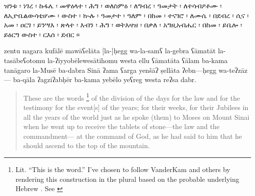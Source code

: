 \begin{ethiopictext}
        ዝንቱ ፡ ነገረ ፡ ኩፋሌ ፡
        መዋዕላተ ፡ ሕግ ፡ ወለስምዕ ፡
        ለግብረ ፡ ዓመታት ፡ ለተሳብዖቶሙ ፡ 
        ለኢዮቤልውሳቲሆሙ ፡ ውስተ ፡ ኲሉ ፡ ዓመታተ ፡ ዓለም ፡
        በከመ ፡ ተናገሮ ፡ ለሙሴ ፡ በደብረ ፡ ሲና ፡
        አመ ፡ ዐርገ ፡ ይንሣእ ፡ ጽላተ ፡ እብን ፡ ሕግ ፡ ወትእዛዝ ፡ 
        በቃለ ፡ አግዚአብሔር ፡ በከመ ፡ ይቤሎ ፡ ይዕርግ ውስተ ፡ ርእሰ ፡ ደብር ።
\end{ethiopictext}


\begin{transliteration}
        zentu nagara kufālē
        mawāʕelāta [la-]ḥegg wa-la-samʕ
        la-gebra ʕāmatāt la-tasābeʕotomu
        la-ʔiyyobēlewesātihomu westa \kw{}ellu ʕāmatāta ʕālam
        ba-kama tanāgaro la-Musē ba-dabra Sinā
        ʔama ʕarga yenšāʔ ṣellāta ʔebn---ḥegg wa-teʔzāz---%
        ba-qāla ʔagziʔabḥēr ba-kama yebēlo yeʕreg westa reʔsa dabr.
\end{transliteration}

\begin{quote}
        These are the words%
        \footnote{Lit. ``This is the word.'' I've chosen to follow VanderKam and others by rendering this construction in the plural based on the probable underlying Hebrew . See \cite[125]{vanderkam2018}}
        of the division 
        of the days for the law and for the testimony
        for the event[s] of the years; for their weeks,
        for their Jubilees in all the years of the world
        just as he spoke (them) to Moses on Mount Sinai 
        when he went up to receive the tablets of stone---the law and the commandment---%
        at the command of God, as he had said to him 
        that he should ascend to the top of the mountain.
\end{quote}
%


